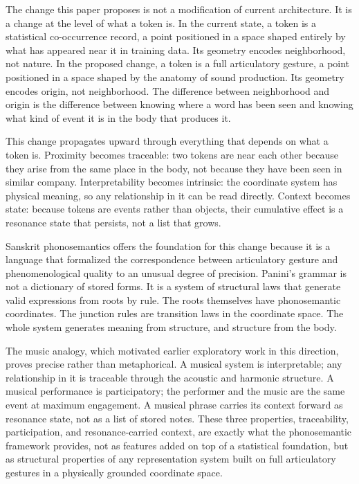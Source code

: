 \documentclass[12pt]{article}
\begin{document}
The change this paper proposes is not a modification of current architecture. It is a change at the level of what a token is. In the current state, a token is a statistical co-occurrence record, a point positioned in a space shaped entirely by what has appeared near it in training data. Its geometry encodes neighborhood, not nature. In the proposed change, a token is a full articulatory gesture, a point positioned in a space shaped by the anatomy of sound production. Its geometry encodes origin, not neighborhood. The difference between neighborhood and origin is the difference between knowing where a word has been seen and knowing what kind of event it is in the body that produces it.

This change propagates upward through everything that depends on what a token is. Proximity becomes traceable: two tokens are near each other because they arise from the same place in the body, not because they have been seen in similar company. Interpretability becomes intrinsic: the coordinate system has physical meaning, so any relationship in it can be read directly. Context becomes state: because tokens are events rather than objects, their cumulative effect is a resonance state that persists, not a list that grows.

Sanskrit phonosemantics offers the foundation for this change because it is a language that formalized the correspondence between articulatory gesture and phenomenological quality to an unusual degree of precision. Panini's grammar is not a dictionary of stored forms. It is a system of structural laws that generate valid expressions from roots by rule. The roots themselves have phonosemantic coordinates. The junction rules are transition laws in the coordinate space. The whole system generates meaning from structure, and structure from the body.

The music analogy, which motivated earlier exploratory work in this direction, proves precise rather than metaphorical. A musical system is interpretable; any relationship in it is traceable through the acoustic and harmonic structure. A musical performance is participatory; the performer and the music are the same event at maximum engagement. A musical phrase carries its context forward as resonance state, not as a list of stored notes. These three properties, traceability, participation, and resonance-carried context, are exactly what the phonosemantic framework provides, not as features added on top of a statistical foundation, but as structural properties of any representation system built on full articulatory gestures in a physically grounded coordinate space.
\end{document}
